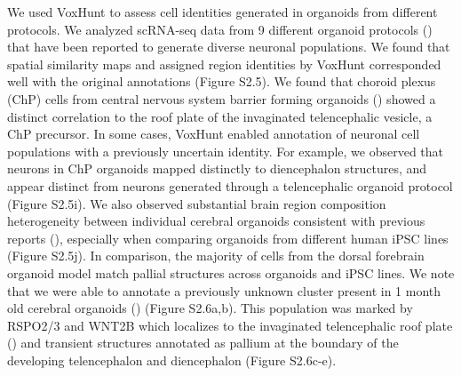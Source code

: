 We used VoxHunt to assess cell identities generated in organoids from different protocols. We analyzed scRNA-seq data from 9 different organoid protocols (\cite{bhaduri_cell_2020,birey_assembly_2017,giandomenico_cerebral_2019,kanton_organoid_2019,pellegrini_human_2020,pollen_establishing_2019,velasco_individual_2019,xiang_hesc-derived_2019}) that have been reported to generate diverse neuronal populations. We found that spatial similarity maps and assigned region identities by VoxHunt corresponded well with the original annotations (Figure S2.5). We found that choroid plexus (ChP) cells from central nervous system barrier forming organoids (\cite{pellegrini_human_2020}) showed a distinct correlation to the roof plate of the invaginated telencephalic vesicle, a ChP precursor. In some cases, VoxHunt enabled annotation of neuronal cell populations with a previously uncertain identity. For example, we observed that neurons in ChP organoids mapped distinctly to diencephalon structures, and appear distinct from neurons generated through a telencephalic organoid protocol (Figure S2.5i). We also observed substantial brain region composition heterogeneity between individual cerebral organoids consistent with previous reports (\cite{kanton_organoid_2019}), especially when comparing organoids from different human iPSC lines (Figure S2.5j). In comparison, the majority of cells from the dorsal forebrain organoid model match pallial structures across organoids and iPSC lines. We note that we were able to annotate a previously unknown cluster present in 1 month old cerebral organoids (\cite{camp_human_2015}) (Figure S2.6a,b). This population was marked by RSPO2/3 and WNT2B which localizes to the invaginated telencephalic roof plate (\cite{kamata_r-spondin_2004}) and transient structures annotated as pallium at the boundary of the developing telencephalon and diencephalon (Figure S2.6c-e). 


